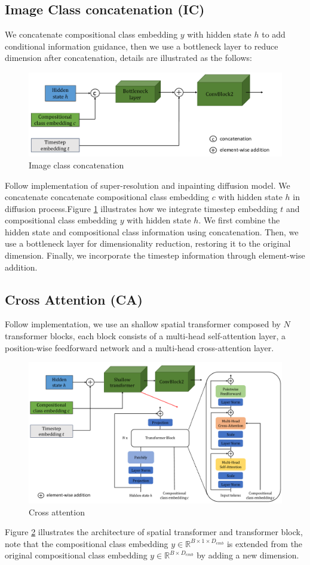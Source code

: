 \subsection{Image Class concatenation (IC)}
We concatenate compositional class embedding $y$ with hidden state $h$ to add conditional information guidance, then we use a bottleneck layer to reduce dimension after concatenation, details are illustrated as the follows:
\begin{figure} [H]
    \centering
    \includegraphics[width=0.8\linewidth]{figures/IC.pdf}
    \caption{Image class concatenation}
    \label{fig:ic}
\end{figure}
Follow \cite{rombach2022high} implementation of super-resolution and inpainting diffusion model. We concatenate concatenate compositional class embedding $c$ with hidden state $h$ in diffusion process.Figure \ref{fig:ic} illustrates how we integrate timestep embedding $t$ and compositional class embedding $y$ with hidden state $h$. We first combine the hidden state and compositional class information using concatenation. Then, we use a bottleneck layer for dimensionality reduction, restoring it to the original dimension. Finally, we incorporate the timestep information through element-wise addition. 

\subsection{Cross Attention (CA)}
Follow \cite{rombach2022high} implementation, we use an shallow spatial transformer composed by $N$ transformer blocks, each block consists of a multi-head self-attention layer, a position-wise feedforward network and a multi-head cross-attention layer.
\begin{figure} [H]
    \centering
    \includegraphics[width=0.8\linewidth]{figures/CA.pdf}
    \caption{Cross attention}
    \label{fig:ca}
\end{figure}
Figure \ref{fig:ca} illustrates the architecture of spatial transformer and transformer block, note that the compositional class embedding $y \in \mathbb{R}^{B \times 1 \times D_{emb}}$ is extended from the original compositional class embedding $y \in \mathbb{R}^{B \times D_{emb}}$ by adding a new dimension.

